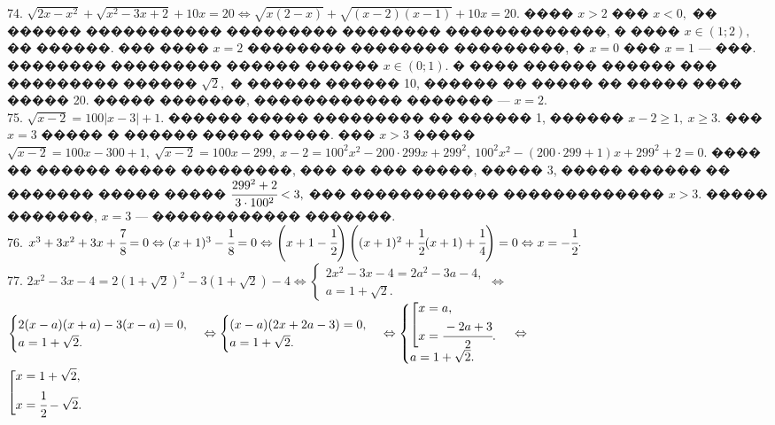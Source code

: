 \documentclass[12pt]{article}
\begin{document}
74. $\sqrt{2x-x^2}+\sqrt{x^2-3x+2}+10x=20\Leftrightarrow \sqrt{x(2-x)}+\sqrt{(x-2)(x-1)}+10x=20.$ ���� $x>2$ ��� $x<0,$ �� ������ ����������� ��������� �������� �������������, � ���� $x\in (1;2),$ �� ������. ��� ���� $x=2$ �������� �������� ���������, �  $x=0$ ��� $x=1$ --- ���. �������� ��������� ������ ������ $x\in(0;1).$ � ���� ������ ������ ��� ��������� ������ $\sqrt{2},$ � ������ ������ 10, ������ �� ����� �� ����� ���� ����� 20. ����� �������, ������������ ������� --- $x=2.$\\
75. $\sqrt{x-2}=100|x-3|+1.$ ������ ����� ��������� �� ������ 1, ������  $x-2\geqslant1,\ x\geqslant3.$ ��� $x=3$ ����� � ������ ����� �����. ��� $x>3$ �����
$\sqrt{x-2}=100x-300+1,\ \sqrt{x-2}=100x-299,\ x-2=100^2x^2-200\cdot299x+299^2,\ 100^2x^2-(200\cdot299+1)x+299^2+2=0.$ ���� �� ������ ����� ���������, ��� �� ��� �����, ����� 3, ����� ������ �� ������� ����� ����� $\cfrac{299^2+2}{3\cdot100^2}<3,$ ��� ������������ ������������� $x>3.$ ����� �������, $x=3$ --- ������������ �������.\\
76. $x^3+3x^2+3x+\cfrac{7}{8}=0 \Leftrightarrow (x+1)^3-\cfrac{1}{8}=0\Leftrightarrow \left(x+1-\cfrac{1}{2}\right)\left((x+1)^2+\cfrac{1}{2}(x+1)+\cfrac{1}{4}\right)=0\Leftrightarrow x=-\cfrac{1}{2}.$\\
77. $2x^2-3x-4=2(1+\sqrt{2})^2-3(1+\sqrt{2})-4\Leftrightarrow\begin{cases}2x^2-3x-4=2a^2-3a-4,\\ a=1+\sqrt{2}.\end{cases}
\Leftrightarrow$\\$\begin{cases}2(x-a)(x+a)-3(x-a)=0,\\ a=1+\sqrt{2}.\end{cases}
\Leftrightarrow\begin{cases}(x-a)(2x+2a-3)=0,\\ a=1+\sqrt{2}.\end{cases}
\Leftrightarrow \begin{cases}\left[\begin{gathered}
     x=a,\hfill\\
     x=\cfrac{-2a+3}{2}.\hfill \end{gathered}\right.\\ a=1+\sqrt{2}.\end{cases}\Leftrightarrow$\\$
\left[\begin{gathered}
     x=1+\sqrt{2},\hfill\\
     x=\cfrac{1}{2}-\sqrt{2}.\hfill \end{gathered}\right.$\\
\end{document}
